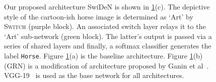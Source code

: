 \documentclass[preprint]{sig-alternate-05-2015}
\begin{document}
\begin{figure}[ht]
	\mbox{}\hspace{0.3cm}%
	\mbox{}\hspace{0.3cm}%
	\mbox{}\hspace{0.3cm}%
\caption{Our proposed architecture SwiDeN is shown in \ref{fig:3imgs}(c). The depictive style of the  cartoon-ish horse image is  determined as `Art' by  \textsc{Switch} (purple block). An associated switch layer relays it to the `Art' sub-network (green block). The latter's output is passed via a series of shared layers and finally, a softmax classifier generates the label \texttt{Horse}. Figure  \ref{fig:3imgs}(a) is the baseline architecture. Figure \ref{fig:3imgs}(b) (GRN) is a modification of architecture proposed by Ganin et al~\cite{ganin2015unsupervised}. VGG-19~\cite{Simonyan14c} is used as the base network for all architectures.}
\label{fig:3imgs}
\end{figure}
\end{document}
